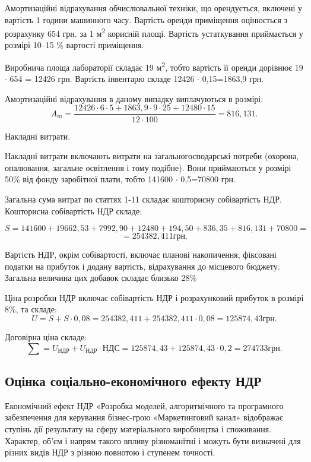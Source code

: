 Амортизаційні відрахування обчислювальної техніки, що орендується, включені у вартість 1 години машинного часу. Вартість оренди приміщення оцінюється з розрахунку 654 грн. за 1 м\textsuperscript{2} корисній площі. Вартість устаткування приймається у розмірі 10--15 \% вартості приміщення. 

Виробнича площа лабораторії складає 19 м\textsuperscript{2}, тобто вартість її оренди дорівнює 19 $\cdot$  654 = 12426 грн. Вартість інвентарю складе 12426 $\cdot$  0,15=1863,9 грн.

Амортизаційні відрахування в даному випадку виплачуються в розмірі:
\begin{equation}
A_m = \frac{12426  \cdot  6  \cdot  5+1863,9  \cdot  9  \cdot  25+12480  \cdot  15}{12  \cdot  100} = 816,131. \nonumber
\end{equation}

Накладні витрати.

Накладні витрати включають витрати на загальногосподарські потреби (охорона, опалювання, загальне освітлення і тому подібне). Вони приймаються у розмірі 50\% від фонду заробітної плати, тобто 141600 $\cdot$  0,5=70800 грн. 

Загальна сума витрат по статтях 1-11 складає кошторисну собівартість НДР. Кошторисна собівартість НДР складе:

\begin{equation}
S = 141600+19662,53+7992,90+12480+194,50+836,35+816,131 + 70800 = \nonumber
\end{equation}
\begin{equation}
 = 254382,411 грн. \nonumber
\end{equation}

Вартість НДР, окрім собівартості, включає планові накопичення, фіксовані податки на прибуток і додану вартість, відрахування до місцевого бюджету. Загальна величина цих добавок складає близько 28\%

Ціна розробки НДР включає собівартість НДР і розрахунковий прибуток в розмірі 8\%, та складе:
\begin{equation}
U=S+S  \cdot  0,08= 254382,411+254382,411  \cdot  0,08=125874,43 грн. \nonumber
\end{equation}

Договірна ціна складе: 
\begin{equation}
\sum = U_{\text{НДР}} + U_{\text{НДР}} \cdot {\text{НДС}} = 125874,43+125874,43  \cdot  0,2=274733 грн. \nonumber
\end{equation}

\subsection{Оцінка соціально-економічного ефекту НДР}
Економічний ефект НДР «Розробка моделей, алгоритмічного та програмного забезпечення для керування бізнес-грою «Маркетинговий канал» відображає ступінь дії результату на сферу матеріального виробництва і споживання. Характер, об'єм і напрям такого впливу різноманітні і можуть бути визначені для різних видів НДР з різною повнотою і ступенем точності.

